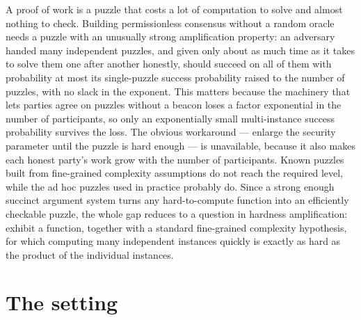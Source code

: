 \documentclass{conjura-conjecture}
\begin{document}

\vspace{0.4em}

\begin{informalconjecture}
A proof of work is a puzzle that costs a lot of computation to solve and almost nothing to check. Building permissionless consensus without a random oracle needs a puzzle with an unusually strong amplification property: an adversary handed many independent puzzles, and given only about as much time as it takes to solve them one after another honestly, should succeed on all of them with probability at most its single-puzzle success probability raised to the number of puzzles, with no slack in the exponent. This matters because the machinery that lets parties agree on puzzles without a beacon loses a factor exponential in the number of participants, so only an exponentially small multi-instance success probability survives the loss. The obvious workaround --- enlarge the security parameter until the puzzle is hard enough --- is unavailable, because it also makes each honest party's work grow with the number of participants. Known puzzles built from fine-grained complexity assumptions do not reach the required level, while the ad hoc puzzles used in practice probably do. Since a strong enough succinct argument system turns any hard-to-compute function into an efficiently checkable puzzle, the whole gap reduces to a question in hardness amplification: exhibit a function, together with a standard fine-grained complexity hypothesis, for which computing many independent instances quickly is exactly as hard as the product of the individual instances.
\end{informalconjecture}

\section{The setting}\label{sec:setting}
\end{document}
